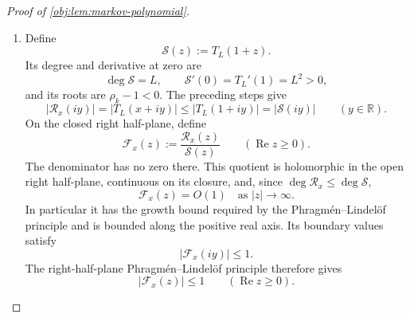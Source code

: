 \documentclass[11pt]{article}
\begin{document}
\begin{proof}[Proof of \cref{obj:lem:markov-polynomial}]
\begin{enumerate}
For the fixed \(x\), define
\[
\theta_x:=\arccos x,\qquad
\delta_{\mathrm{ang}}:=\frac{\pi}{2L}.
\]
Choose \(k_{\mathrm{shift}}\in\mathbb Z\) nearest to \(L\theta_x/\pi\), and put
\[
\phi_x:=\theta_x-\frac{k_{\mathrm{shift}}\pi}{L},
\qquad
|\phi_x|\le\delta_{\mathrm{ang}}.
\]
The two lists \(\mathscr D_L(\theta_x)\) and
\(\mathscr D_L(\phi_x)\) have the same multiset of entries: their angles run through the odd multiples of \(\pi/(2L)\), shifted by the respective angle, and adding an integer multiple of \(\pi/L\) permutes these angles modulo \(2\pi\).

Define
\[
q_{k,+}:=d_{\mathrm{ch}}(\alpha_k+|\phi_x|),
\qquad
q_{k,-}:=d_{\mathrm{ch}}(\alpha_k-|\phi_x|)
\quad(0\le k<L).
\]
All the arguments lie in \([0,\pi]\). Since \(d_{\mathrm{ch}}\) increases on this interval and consecutive root angles differ by \(2\delta_{\mathrm{ang}}\),
\[
q_{k,-}\le q_{k,+},
\qquad
q_{k,+}\le q_{k+1,-}\quad(0\le k<L-1).
\]
Hence reversing the root blocks and placing \(q_{k,+}\) before \(q_{k,-}\) gives a decreasing list. Replacing \(\phi_x\) by \(|\phi_x|\) merely exchanges the two entries within a block, and reversing blocks preserves their paired product. The sorting inequality therefore implies
\[
\mathcal P_{4y^2}\bigl(\mathscr D_L(\theta_x)\bigr)
\le
\mathcal P_{4y^2}\bigl(\mathscr D_L(\phi_x)\bigr).
\]
The elementary chord identity
\[
d_{\mathrm{ch}}(\theta+\alpha_k)
d_{\mathrm{ch}}(\theta-\alpha_k)
=4(\cos\theta-\rho_k)^2
\]
turns this into
\[
4^L\left(\prod_{k=0}^{L-1}|x-\rho_k+iy|\right)^2
\le
4^L\left(\prod_{k=0}^{L-1}|\cos\phi_x-\rho_k+iy|\right)^2.
\]
The products are nonnegative, so
\[
\prod_{k=0}^{L-1}|x-\rho_k+iy|
\le
\prod_{k=0}^{L-1}|\cos\phi_x-\rho_k+iy|.
\]
Also
\[
\rho_k\le\cos\delta_{\mathrm{ang}}
\le\cos\phi_x\le1.
\]
Thus each factor on the right is bounded by its endpoint counterpart:
\[
|\cos\phi_x-\rho_k+iy|^2
=(\cos\phi_x-\rho_k)^2+y^2
\le(1-\rho_k)^2+y^2
=|1-\rho_k+iy|^2.
\]
Multiplying these bounds and then multiplying by \(2^{L-1}\) proves the required vertical comparison.

\item Define
\[
\mathcal S(z):=T_L(1+z).
\]
Its degree and derivative at zero are
\[
\deg\mathcal S=L,\qquad \mathcal S'(0)=T_L'(1)=L^2>0,
\]
and its roots are \(\rho_k-1<0\). The preceding steps give
\[
|\mathcal R_x(iy)|=|T_L(x+iy)|
\le|T_L(1+iy)|=|\mathcal S(iy)|
\qquad(y\in\mathbb R).
\]
On the closed right half-plane, define
\[
\mathcal F_x(z):=\frac{\mathcal R_x(z)}{\mathcal S(z)}
\qquad(\operatorname{Re}z\ge0).
\]
The denominator has no zero there. This quotient is holomorphic in the open right half-plane, continuous on its closure, and, since
\(\deg\mathcal R_x\le\deg\mathcal S\),
\[
\mathcal F_x(z)=O(1)\quad\text{as }|z|\to\infty.
\]
In particular it has the growth bound required by the
Phragm\'en--Lindel\"of principle and is bounded along the positive real axis.
Its boundary values satisfy
\[
|\mathcal F_x(iy)|\le1.
\]
The right-half-plane Phragm\'en--Lindel\"of principle therefore gives
\[
|\mathcal F_x(z)|\le1
\qquad(\operatorname{Re}z\ge0).
\]


\end{enumerate}
\end{proof}
\end{document}
